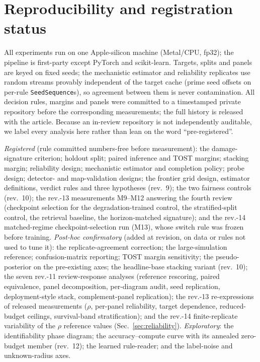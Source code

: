\documentclass[aip,cha,amsmath,amssymb,reprint,floatfix]{revtex4-2}
\begin{document}
\appendix

\section{Reproducibility and registration status}
\label{app:repro}

All experiments run on one Apple-silicon machine (Metal/CPU, fp32); the
pipeline is first-party except PyTorch and scikit-learn. Targets, splits and
panels are keyed on fixed seeds; the mechanistic estimator and reliability
replicates use random streams provably independent of the target cache (prime
seed offsets on per-rule \texttt{SeedSequence}s), so agreement between them is
never contamination. All decision rules, margins and panels were committed to
a timestamped private repository before the corresponding measurements; the
full history is released with the article. Because an in-review repository is
not independently auditable, we label every analysis here rather than lean on
the word ``pre-registered''.

\emph{Registered} (rule committed numbers-free before measurement): the
damage-signature criterion; holdout split; paired inference and TOST margins;
stacking margin; reliability design; mechanistic estimator and completion
policy; probe design; detector- and map-validation designs; the frontier grid
design, estimator definitions, verdict rules and three hypotheses (rev.~9);
the two fairness controls (rev.~10); the rev.-13 measurements M9--M12
answering the fourth review (checkpoint selection for the degradation-trained
control, the stratified-split control, the retrieval baseline, the
horizon-matched signature); and the rev.-14 matched-regime
checkpoint-selection run (M13), whose switch rule was frozen before
training.
\emph{Post-hoc confirmatory} (added at revision, on data or rules not used to
tune it): the replicate-agreement correction; the large-simulation reference;
confusion-matrix reporting; TOST margin sensitivity; the pseudo-posterior on
the pre-existing axes; the headline-base stacking variant (rev.~10); the seven
rev.-11 review-response analyses (reference rescoring, paired equivalence,
panel decomposition, per-diagram audit, seed replication, deployment-style
stack, complement-panel replication); the rev.-13 re-expressions of
released measurements ($\rho$, per-panel reliability, target dependence,
reduced-budget ceilings, survival-band stratification); and the rev.-14
finite-replicate variability of the $\rho$ reference values
(Sec.~\ref{sec:reliability}).
\emph{Exploratory}: the identifiability phase diagram; the accuracy--compute
curve with its annealed zero-budget member (rev.~12); the learned rule-reader;
and the label-noise and unknown-radius axes.
\end{document}
